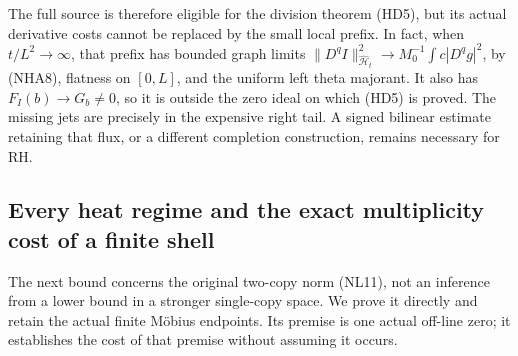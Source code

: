 \documentclass[11pt]{article}
\theoremstyle{remark}\newtheorem{remark}[theorem]{Remark}
\begin{document}
The full source is therefore eligible for the division theorem
(HD5), but its actual derivative costs cannot be replaced by
the small local prefix. In fact, when \(t/L^2\to\infty\), that
prefix has bounded graph limits
\(\|D^qI\|_{\widehat{\mathcal H}_t}^2
 \to M_0^{-1}\int c|D^qg|^2\), by (NHA8), flatness on
\([0,L]\), and the uniform left theta majorant.
It also has \(F_I(b)\to G_b\ne0\), so it is outside the
zero ideal on which (HD5) is proved.
The missing jets are precisely in the expensive right tail.
A signed bilinear estimate retaining that flux, or a different
completion construction, remains necessary for RH.

\subsection{Every heat regime and the exact multiplicity cost of a finite shell}
\label{sec:bimodal-multiplicity-flux}
The next bound concerns the original two-copy norm (NL11),
not an inference from a lower bound in a stronger single-copy
space. We prove it directly and retain the actual finite
M\"obius endpoints. Its premise is one actual off-line zero;
it establishes the cost of that premise without assuming it occurs.
\end{document}
